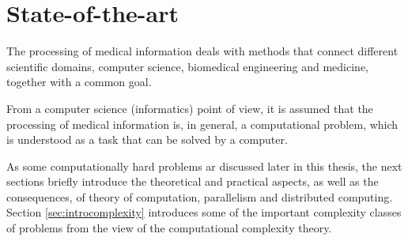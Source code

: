 \chapter{State-of-the-art}
\label{sec:stateoftheart}


The processing of medical information deals with methods that connect different scientific domains, computer science, biomedical engineering and medicine, together with a common goal. 



From a computer science (informatics) point of view, it is assumed that the processing of medical information is, in general, a computational problem, which is understood as a task that can be solved by a computer. 

As some computationally hard problems ar discussed later in this thesis, the next sections briefly introduce the theoretical and practical aspects, as well as the consequences, of theory of computation, parallelism and distributed computing. Section \ref{sec:introcomplexity} introduces some of the important complexity classes of problems from the view of the computational complexity theory. 


